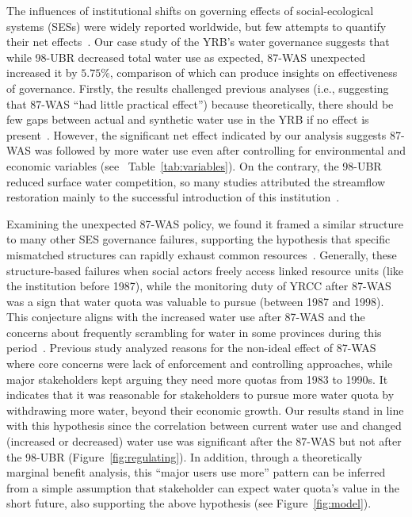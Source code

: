 
The influences of institutional shifts on governing effects of social-ecological systems (SESs) were widely reported worldwide, but few attempts to quantify their net effects~\cite{cumming2020a}.
Our case study of the YRB's water governance suggests that while 98-UBR decreased total water use as expected, 87-WAS unexpected increased it by $5.75\%$, comparison of which can produce insights on effectiveness of governance.
Firstly, the results challenged previous analyses (i.e., suggesting that 87-WAS ``had little practical effect'') because theoretically, there should be few gaps between actual and synthetic water use in the YRB if no effect is present~\cite{abadie2015,hill2021}.
However, the significant net effect indicated by our analysis suggests 87-WAS was followed by more water use even after controlling for environmental and economic variables (see \textit{}~Table~\ref{tab:variables}).
On the contrary, the 98-UBR reduced surface water competition, so many studies attributed the streamflow restoration mainly to the successful introduction of this institution~\cite{chen2021,huangang2002,an2007}.

Examining the unexpected 87-WAS policy, we found it framed a similar structure to many other SES governance failures, supporting the hypothesis that specific mismatched structures can rapidly exhaust common resources~\cite{kellenberg2009,cai2016,barnes2019}.
Generally, these structure-based failures when social actors freely access linked resource units (like the institution before 1987), while the monitoring duty of YRCC after 87-WAS was a sign that water quota was valuable to pursue (between 1987 and 1998).
This conjecture aligns with the increased water use after 87-WAS and the concerns about frequently scrambling for water in some provinces during this period~\cite{mao2000, bouckaert2022}.
Previous study analyzed reasons for the non-ideal effect of 87-WAS~\cite{huangang2002} where core concerns were lack of enforcement and controlling approaches, while major stakeholders kept arguing they need more quotas from 1983 to 1990s.
It indicates that it was reasonable for stakeholders to pursue more water quota by withdrawing more water, beyond their economic growth.
Our results stand in line with this hypothesis since the correlation between current water use and changed (increased or decreased) water use was significant after the 87-WAS but not after the 98-UBR (Figure~\ref{fig:regulating}).
In addition, through a theoretically marginal benefit analysis, this ``major users use more'' pattern can be inferred from a simple assumption that stakeholder can expect water quota's value in the short future, also supporting the above hypothesis (see Figure~\ref{fig:model}).

